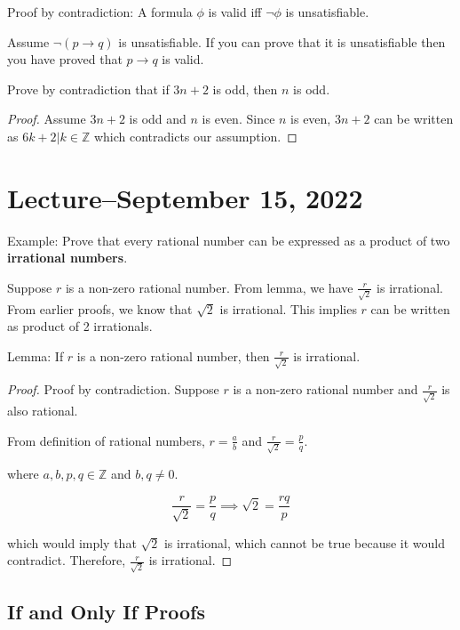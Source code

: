 \documentclass[8pt]{scrreprt}
\begin{document}
\begin{landscape}
\begin{multicols*}{3}
Proof by contradiction: A formula $\phi$ is valid iff $\neg \phi$ is unsatisfiable.

Assume $\neg (p\rightarrow q)$ is unsatisfiable. If you can prove that it is unsatisfiable
then you have proved that $p\rightarrow q$ is valid.

\begin{example}
	Prove by contradiction that if $3n+2$ is odd, then $n$ is odd.

	\begin{proof}
		Assume $3n+2$ is odd and $n$ is even. Since $n$ is even, $3n+2$ can be written as
		$6k+2 | k\in \mathbb{Z}$ which contradicts our assumption.
	\end{proof}
\end{example}

\section{Lecture--September 15, 2022}

\begin{example}
	Example: Prove that every rational number can be expressed as a product of two
	\textbf{irrational numbers}.

	Suppose $r$ is a non-zero rational number. From lemma, we have $\frac{r}{\sqrt{2}}$
	is irrational. From earlier proofs, we know that $\sqrt{2}$ is irrational. This implies $r$
	can be written as product of 2 irrationals.

	Lemma: If $r$ is a non-zero rational number, then $\frac{r}{\sqrt{2}}$ is irrational.

	\begin{proof}
		Proof by contradiction. Suppose $r$ is a non-zero rational number and $\frac{r}{\sqrt{2}}$
		is also rational.

		From definition of rational numbers, $r=\frac{a}{b}$ and $\frac{r}{\sqrt{2}}=\frac{p}{q}$.

		where $a,b,p,q\in \mathbb{Z}$ and $b,q\neq 0$.

		\[
			\frac{r}{\sqrt{2}} = \frac{p}{q}\implies \sqrt{2}=\frac{rq}{p}
		\]

		which would imply that $\sqrt{2}$ is irrational, which cannot be true
		because it would contradict. Therefore, $\frac{r}{\sqrt{2}}$ is irrational.
	\end{proof}
\end{example}

\subsection{If and Only If Proofs}


\end{multicols*}
\end{landscape}
\end{document}
